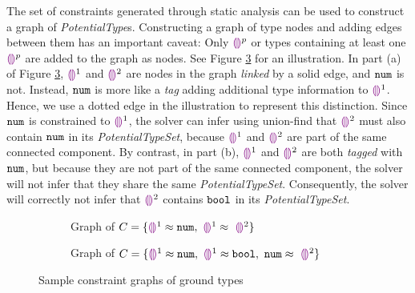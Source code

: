 The set of constraints generated through static analysis can be used to construct a graph of \textit{PotentialType}s. Constructing a graph of type nodes and adding edges between them has an important caveat: Only $\tehole^{p}$ or types containing at least one $\tehole^{p}$ are added to the graph as nodes. See Figure \ref{fig:ex1ex2graphs} for an illustration. In part (a) of Figure \ref{fig:ex1ex2graphs}, $\tehole^{1}$ and $\tehole^{2}$ are nodes in the graph \textit{linked} by a solid edge, and $\tnum$ is not. Instead, $\tnum$ is more like a \textit{tag} adding additional type information to $\tehole^{1}$. Hence, we use a dotted edge in the illustration to represent this distinction. Since $\tnum$ is constrained to $\tehole^{1}$, the solver can infer using union-find that $\tehole^{2}$ must also contain $\tnum$ in its \textit{PotentialTypeSet}, because $\tehole^{1}$ and $\tehole^{2}$ are part of the same connected component. By contrast, in part (b), $\tehole^{1}$ and $\tehole^{2}$ are both \textit{tagged} with $\tnum$, but because they are not part of the same connected component, the solver will not infer that they share the same \textit{PotentialTypeSet}. Consequently, the solver will correctly not infer that $\tehole^2$ contains $\tbool$ in its \textit{PotentialTypeSet}.

\begin{figure}[h!]
\centering
\begin{subfigure}{.49\textwidth}
  \centering
  \caption{Graph of $C = \{ \tehole^{1} \approx \tnum, ~ \tehole^{1} \approx~ \tehole^{2}\}$}
  \label{fig:sub1}
\end{subfigure}
\begin{subfigure}{.49\textwidth}
  \centering
  \caption{Graph of $C = \{ \tehole^1 \approx \tnum, ~ \tehole^1 \approx \tbool, ~ \tnum \approx~ \tehole^2\}$}
  \label{fig:sub2}
\end{subfigure}
\caption{Sample constraint graphs of ground types}
\label{fig:ex1ex2graphs}
\end{figure}

